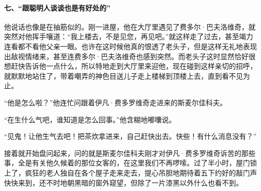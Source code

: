 \paragraph*{七、“跟聪明人谈谈也是有好处的”}
\par 他说话也像是在抽筋似的。刚一进屋，他在大厅里遇见了费多尔·巴夫洛维奇，就突然对他挥手嚷道：“我上楼去，不是见您，再见吧。”就这样走了过去，甚至竭力连看都不看他父亲一眼。也许在这时候他真的恨透了老头子，但是这样无礼地表现出敌视情绪来，甚至连费多尔·巴夫洛维奇也感到突然。而老头子这时显然恰好很想赶快告诉他一点什么，所以特地走到大厅里来迎他，现在碰到这样亲切的招呼，就默默地站住了，带着嘲弄的神色目送儿子走上楼梯到顶楼上去，直到看不见为止。
\par “他是怎么啦？”他连忙问跟着伊凡·费多罗维奇走进来的斯麦尔佳科夫。
\par “在生什么气吧，谁知道是怎么回事。”他含糊地嘟囔说。
\par “见鬼！让他生气去吧！把茶炊拿进来，自己赶快出去。快些！有什么消息没有？”
\par 接着就开始盘问起来，问的就是斯麦尔佳科夫刚才对伊凡·费多罗维奇诉苦的那些事，全是有关他久候着的那位女客的，在这里我们不再啰嗦。过了半小时，屋门锁上了，疯狂的老人独自在各个屋子走来走去，提心吊胆地期待着五下约好的敲门声快快来到，还不时地朝黑暗的窗外窥望，但除了一片漆黑以外什么也看不到。
